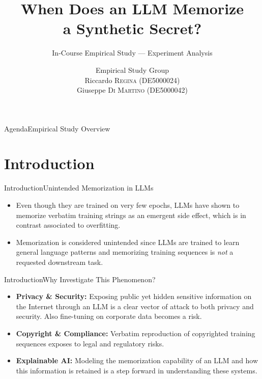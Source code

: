 \documentclass[10pt,aspectratio=43
	]{beamer}
\title[Unintended Memorization in LLMs] %
	{When Does an LLM Memorize \\a Synthetic Secret?} %
\subtitle{In-Course Empirical Study --- Experiment Analysis}
\author[Riccardo Regina, Giuseppe Di Martino] %
	{%
		{\footnotesize Empirical Study Group}\\
        Riccardo \textsc{Regina} (DE5000024) \\Giuseppe \textsc{Di Martino} (DE5000042)
	}
\institute[
		Department of Electrical Engineering and Information Technology\\
		Università degli Studi di Napoli Federico II\\
		Italy
	]
	{%
		Università degli Studi di Napoli Federico II
	}
\begin{document}
	\maketitle

	\begin{frame}{Agenda}{Empirical Study Overview}
		\tableofcontents
	\end{frame}

\section{Introduction}

	\begin{frame}{Introduction}{Unintended Memorization in LLMs}
        \begin{itemize}
            \item Even though they are trained on very few epochs, LLMs have shown to \alert{memorize} verbatim training strings as an emergent side effect, which is in contrast associated to overfitting.
            \item Memorization is considered \alert{unintended} since LLMs are trained to learn general language patterns and memorizing training sequences is \emph{not} a requested downstream task.
        \end{itemize}
	\end{frame}

    \begin{frame}{Introduction}{Why Investigate This Phenomenon?}
        \begin{itemize}
            \item \textbf{Privacy \& Security:} Exposing public yet hidden sensitive information on the Internet through an LLM is a clear vector of attack to both privacy and security. Also fine-tuning on corporate data becomes a risk.
            \item \textbf{Copyright \& Compliance:} Verbatim reproduction of copyrighted training sequences exposes to legal and regulatory risks.
            \item \textbf{Explainable AI:} Modeling the memorization capability of an LLM and how this information is retained is a step forward in understanding these systems.
        \end{itemize}
    \end{frame}
\end{document}
